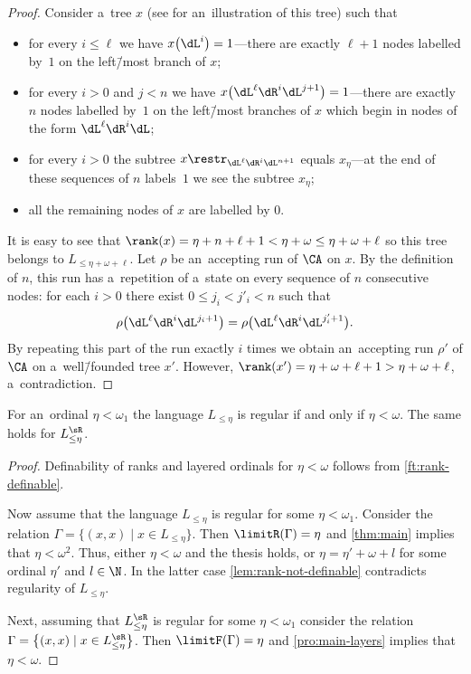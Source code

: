 \begin{proof}
	Consider a~tree $x$ (see  for an~illustration of this tree) such that
	\begin{itemize}
	\item for every $i\leq \ell$ we have $x\big(\dL^i\big)=1$---there are exactly $\ell{+}1$ nodes labelled by~$1$ on the left\=/most branch of $x$;
	\item for every $i>0$ and $j<n$ we have $x\big(\dL^{\ell}\dR^i\dL^{j+1}\big)=1$---there are exactly $n$ nodes labelled by~$1$ on the left\=/most branches of $x$ which begin in nodes of the form $\dL^{\ell}\dR^i\dL$;
	\item for every $i>0$ the subtree $x\restr_{\dL^{\ell}\dR^i\dL^{n+1}}$ equals $x_\eta$---at the end of these sequences of $n$ labels~$1$ we see the subtree $x_\eta$;
	\item all the remaining nodes of $x$ are labelled by $0$.
	\end{itemize}
	\noindent %
	It is easy to see that $\rank(x)=\eta+n+\ell+1<\eta+\omega\leq\eta+\omega+\ell$ so this tree belongs to $L_{\leq \eta+\omega+\ell}$.
	Let $\rho$ be an~accepting run of $\CA$ on $x$.
	By the definition of $n$, this run has a~repetition of a~state on every sequence of $n$ consecutive nodes: for each $i>0$ there exist $0\leq j_i<j'_i<n$ such that
	\[\rho\big(\dL^{\ell}\dR^i\dL^{j_i+1}\big)=\rho\big(\dL^{\ell}\dR^i\dL^{j'_i+1}\big).\]
	By repeating this part of the run exactly $i$ times we obtain an~accepting run $\rho'$ of $\CA$ on a~well\=/founded tree $x'$.
	However, $\rank(x')=\eta+\omega+\ell+1>\eta+\omega+\ell$, a~contradiction.
\end{proof}

\begin{cor}\label{cor:not-expressible}
	For an~ordinal $\eta<\omega_1$ the language $L_{\leq\eta}$ is regular if and only if $\eta<\omega$.
	The same holds for $L^{\sR}_{\leq\eta}$.
\end{cor}

\begin{proof}
	Definability of ranks and layered ordinals for $\eta<\omega$ follows from \cref{ft:rank-definable}.

	Now assume that the language $L_{\leq\eta}$ is regular for some $\eta<\omega_1$.
	Consider the relation $\Gamma=\big\{(x,x)\mid x\in L_{\leq\eta}\big\}$.
	Then $\limitR(\Gamma)=\eta$ and \cref{thm:main} implies that $\eta <\omega^2$.
	Thus, either $\eta<\omega$ and the thesis holds, or $\eta=\eta'+\omega+l$ for some ordinal $\eta'$ and $l\in\N$.
	In the latter case \cref{lem:rank-not-definable} contradicts regularity of $L_{\leq\eta}$.

	Next, assuming that $L^{\sR}_{\leq\eta}$ is regular for some $\eta<\omega_1$ consider the relation $\Gamma=\big\{(x,x)\mid x\in L^{\sR}_{\leq\eta}\big\}$.
	Then $\limitF(\Gamma)=\eta$ and \cref{pro:main-layers} implies that $\eta <\omega$.
\end{proof}

